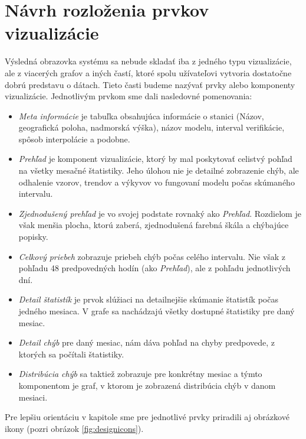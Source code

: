 \section{Návrh rozloženia prvkov vizualizácie}
Výsledná obrazovka systému sa nebude skladať iba z jedného typu vizualizácie, ale z viacerých grafov a iných častí, ktoré spolu užívateľovi vytvoria dostatočne dobrú predstavu o dátach. Tieto časti budeme nazývať prvky alebo komponenty vizualizácie. Jednotlivým prvkom sme dali nasledovné pomenovania: 

\begin{itemize}
	\item\textit{Meta informácie} je tabuľka obsahujúca informácie o stanici (Názov, geografická poloha, nadmorská výška), názov modelu, interval verifikácie, spôsob interpolácie a podobne.  
		
	\item\textit{Prehľad} je komponent vizualizácie, ktorý by mal poskytovať celistvý pohľad na všetky mesačné štatistiky. Jeho úlohou nie je detailné zobrazenie chýb, ale odhalenie vzorov, trendov a výkyvov vo fungovaní modelu počas skúmaného intervalu.
	
	\item\textit{Zjednodušený prehľad} je vo svojej podstate rovnaký ako \textit{Prehľad}. Rozdielom je však menšia plocha, ktorú zaberá, zjednodušená farebná škála a chýbajúce popisky.
	
	\item\textit{Celkový priebeh} zobrazuje priebeh chýb počas celého intervalu. Nie však z pohľadu 48 predpovedných hodín (ako \textit{Prehľad}), ale z pohľadu jednotlivých dní.
	
	\item\textit{Detail štatistík} je prvok slúžiaci na detailnejšie skúmanie štatistík počas jedného mesiaca. V grafe sa nachádzajú všetky dostupné štatistiky pre daný mesiac.
	
	\item\textit{Detail chýb} pre daný mesiac, nám dáva pohľad na chyby predpovede, z ktorých sa počítali štatistiky.
	
	\item\textit{Distribúcia chýb} sa taktiež zobrazuje pre konkrétny mesiac a týmto komponentom je graf, v ktorom je zobrazená distribúcia chýb v danom mesiaci.
\end{itemize}

\noindent Pre lepšiu orientáciu v kapitole sme pre jednotlivé prvky priradili aj obrázkové ikony (pozri obrázok \ref{fig:designicons}). 
 
